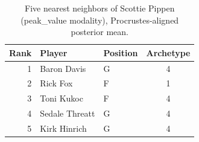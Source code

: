 \begin{table}[htbp]
  \centering\small
  \begin{tabular}{rllc}
    \toprule
    Rank & Player & Position & Archetype \\
    \midrule
    1 & Baron Davis & G & 4 \\
    2 & Rick Fox & F & 1 \\
    3 & Toni Kukoc & F & 4 \\
    4 & Sedale Threatt & G & 4 \\
    5 & Kirk Hinrich & G & 4 \\
    \bottomrule
  \end{tabular}
  \caption{Five nearest neighbors of Scottie Pippen (peak_value modality), Procrustes-aligned posterior mean.}
  \label{tab:Scottie_Pippen_neighbors_peak_value}
\end{table}

